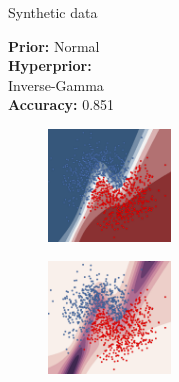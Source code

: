 \documentclass{beamer}
\begin{document}
\begin{frame}{Synthetic data}
\begin{minipage}[t]{0.32\columnwidth}
	\vspace{0.2cm}
	\textbf{Prior:} Normal \\
	\textbf{Hyperprior:} \\Inverse-Gamma\\
	\textbf{Accuracy:} 0.851
\end{minipage}
\begin{minipage}[t]{0.32\columnwidth}
	\begin{figure}
		\includegraphics[height=3cm]{pres_pics/moons_inv_gauss_ppm.png}
	\end{figure}
\end{minipage}
\begin{minipage}[t]{0.32\columnwidth}
	\begin{figure}
		\includegraphics[height=3cm]{pres_pics/moons_inv_gauss_uncert.png}
	\end{figure}
\end{minipage}
\end{frame}
\end{document}
